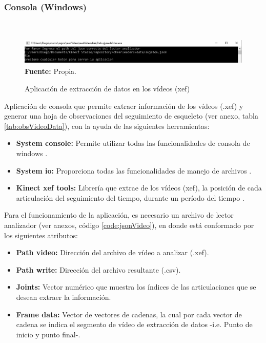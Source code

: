 \subsubsection{Consola (Windows)}\mbox{} \\ \label{ins:cons}
\begin{figure}[H]
	\caption{Aplicaci\'on de extracci\'on de datos en los v\'ideos (xef)}
	\label{fig:appConsole}
	\centering
	\includegraphics[width=460px,height=50px]{graphics/appConsole.PNG} \\
	\textbf{Fuente:} Propia.
\end{figure} 
Aplicaci\'on de consola que permite extraer informaci\'on de los v\'ideos (.xef) y generar una hoja de observaciones del seguimiento de esqueleto (ver anexo, tabla \ref{tab:obsVideoData}), con la ayuda de las siguientes herramientas:
\begin{itemize}
\item \textbf{System console:} Permite utilizar todas las funcionalidades de consola de windows \cite{windowConsole2019}.
\item \textbf{System io:} Proporciona todas las  funcionalidades de manejo de archivos \cite{windowIO2019}.
\item \textbf{Kinect xef tools:} Librer\'ia que extrae de los v\'ideos (xef), la posici\'on de cada articulaci\'on del seguimiento del tiempo, durante un per\'iodo del tiempo \cite{kinectXEFTools}.
\end{itemize}
Para el funcionamiento de la aplicaci\'on, es necesario un archivo de lector analizador (ver anexos, c\'odigo \ref{code:jsonVideo}), en donde est\'a conformado por los siguientes atributos:
\begin{itemize}
\item \textbf{Path video:} Direcci\'on del archivo  de v\'ideo a analizar (.xef).
\item \textbf{Path write:} Direcci\'on del archivo  resultante (.csv).
\item \textbf{Joints:} Vector num\'erico que muestra los \'indices de las articulaciones que se desean extraer la informaci\'on.
\item \textbf{Frame data:} Vector de vectores de cadenas, la cual por cada vector de cadena se indica el segmento de v\'ideo de extracci\'on de datos -i.e. Punto de inicio y punto final-.
\end{itemize}
